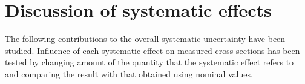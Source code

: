 % 
% 




\section{Discussion of systematic effects}\label{sec:systEffectsList}
The following contributions to the overall systematic uncertainty have been studied. Influence of each systematic effect on measured cross sections has been tested by changing amount of the quantity that the systematic effect refers to and comparing the result with that obtained using nominal values.

